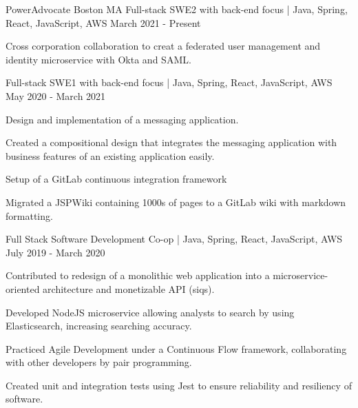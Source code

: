 
\begin{cventries}
\cventrythreepositions
    {PowerAdvocate}
    {Boston MA}
    {Full-stack SWE2 with back-end focus | Java, Spring, React, JavaScript, AWS} %
    {March 2021 - Present} %
    {
        \begin{cvitems} %
            \item {Cross corporation collaboration to creat a federated user management and identity microservice with Okta and SAML.}
        \end{cvitems}
    }
    {Full-stack SWE1 with back-end focus | Java, Spring, React, JavaScript, AWS}
    {May 2020 - March 2021}
    {
      \begin{cvitems} %
        \item {Design and implementation of a messaging application.}
        \item {Created a compositional design that integrates the messaging application with business features of an existing application easily.}
        \item {Setup of a GitLab continuous integration framework}
        \item {Migrated a JSPWiki containing 1000s of pages to a GitLab wiki with markdown formatting.}
      \end{cvitems}
    }
    {Full Stack Software Development Co-op | Java, Spring, React, JavaScript, AWS}
    {July 2019 - March 2020}
    {
      \begin{cvitems} %
        \item {Contributed to redesign of a monolithic web application into a microservice-oriented architecture and monetizable API (siqs).}
        \item {Developed NodeJS microservice allowing analysts to search by using Elasticsearch, increasing searching accuracy.}
        \item {Practiced Agile Development under a Continuous Flow framework, collaborating with other developers by pair programming.}
        \item {Created unit and integration tests using Jest to ensure reliability and resiliency of software.}
      \end{cvitems}
    }


\end{cventries}
